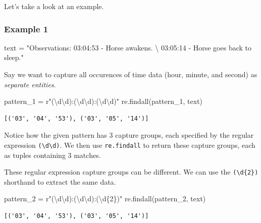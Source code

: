 \documentclass[
  letterpaper,
  DIV=11,
  numbers=noendperiod]{scrreprt}
\newenvironment{Shaded}{\begin{snugshade}}{\end{snugshade}}
\newcommand{\CharTok}[1]{\textcolor[rgb]{0.13,0.47,0.30}{#1}}
\newcommand{\NormalTok}[1]{\textcolor[rgb]{0.00,0.23,0.31}{#1}}
\newcommand{\OperatorTok}[1]{\textcolor[rgb]{0.37,0.37,0.37}{#1}}
\newcommand{\SpecialCharTok}[1]{\textcolor[rgb]{0.37,0.37,0.37}{#1}}
\newcommand{\StringTok}[1]{\textcolor[rgb]{0.13,0.47,0.30}{#1}}
\newcommand{\VerbatimStringTok}[1]{\textcolor[rgb]{0.13,0.47,0.30}{#1}}
\begin{document}
Let's take a look at an example.

\subsubsection{Example 1}\label{example-1}

\begin{Shaded}
\begin{Highlighting}[]
\NormalTok{text }\OperatorTok{=} \StringTok{"Observations: 03:04:53 {-} Horse awakens. }\CharTok{\textbackslash{}}
\StringTok{        03:05:14 {-} Horse goes back to sleep."}
\end{Highlighting}
\end{Shaded}

Say we want to capture all occurences of time data (hour, minute, and
second) as \emph{separate entities}.

\begin{Shaded}
\begin{Highlighting}[]
\NormalTok{pattern\_1 }\OperatorTok{=} \VerbatimStringTok{r"(\textbackslash{}d\textbackslash{}d):(\textbackslash{}d\textbackslash{}d):(\textbackslash{}d\textbackslash{}d)"}
\NormalTok{re.findall(pattern\_1, text)}
\end{Highlighting}
\end{Shaded}

\begin{verbatim}
[('03', '04', '53'), ('03', '05', '14')]
\end{verbatim}

Notice how the given pattern has 3 capture groups, each specified by the
regular expression \texttt{(\textbackslash{}d\textbackslash{}d)}. We
then use \texttt{re.findall} to return these capture groups, each as
tuples containing 3 matches.

These regular expression capture groups can be different. We can use the
\texttt{(\textbackslash{}d\{2\})} shorthand to extract the same data.

\begin{Shaded}
\begin{Highlighting}[]
\NormalTok{pattern\_2 }\OperatorTok{=} \VerbatimStringTok{r"(\textbackslash{}d\textbackslash{}d):(\textbackslash{}d\textbackslash{}d):(\textbackslash{}d}\SpecialCharTok{\{2\}}\VerbatimStringTok{)"}
\NormalTok{re.findall(pattern\_2, text)}
\end{Highlighting}
\end{Shaded}

\begin{verbatim}
[('03', '04', '53'), ('03', '05', '14')]
\end{verbatim}
\end{document}
